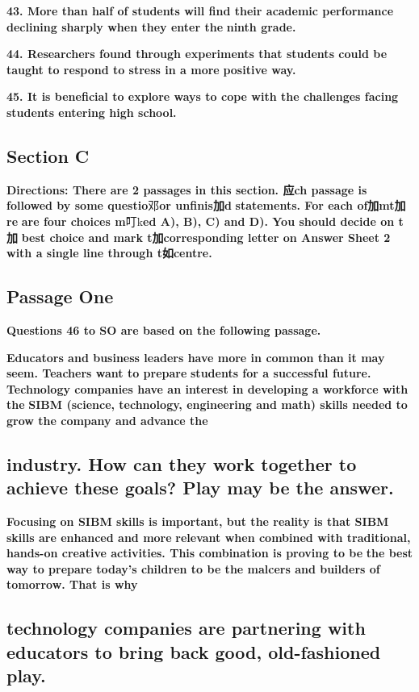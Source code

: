 \documentclass[UTF8,11pt]{ctexart}
\begin{document}
\textbf{43. More than half of students will find their academic performance declining sharply when they enter the} \textbf{ninth grade.}


\textbf{44. Researchers found through experiments that students could be taught to respond to stress in a more} \textbf{positive way.}


\textbf{45. It is beneficial to explore ways to cope with the challenges facing students entering high school.}


\subsection*{\textbf{Section C}}


\textbf{Directions: There are 2 passages in this section. 应ch passage is followed by some questio}邓\textbf{or unfinis加d} \textbf{statements. For each of加mt加re} \textbf{are four choices m}叮k\textbf{ed A), B), C) and D). You should decide on t加} \textbf{best choice and mark t加corresponding letter on Answer Sheet 2 with a single line through t如centre.}


\subsection*{\textbf{Passage One}}


\textbf{Questions 46 to SO are based on the following passage.}


\textbf{Educators and business leaders have more in common than it may seem. Teachers want to prepare} \textbf{students for a successful future. Technology companies have an interest in developing a workforce with the} \textbf{SIBM (science, technology, engineering and math) skills needed to grow the company and advance the}


\subsection*{\textbf{industry. How can they work together to achieve these goals? Play may be the answer.}}


\textbf{Focusing on SIBM skills is important, but the reality is that SIBM skills are enhanced and more} \textbf{relevant when combined with traditional, hands-on creative activities. This combination is proving to be} \textbf{the best way to prepare today's children to be the malcers and builders of tomorrow. That is why}


\subsection*{\textbf{technology companies are partnering with educators to bring back good, old-fashioned play.}}
\end{document}
